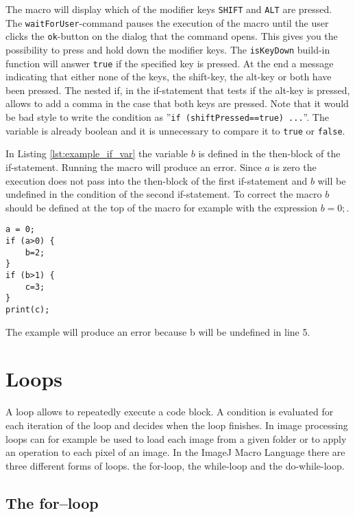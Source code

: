 The macro will display which of the modifier keys {\tt SHIFT} and {\tt ALT} are pressed. The {\tt waitForUser}-command pauses the execution of the macro until the user clicks the {\tt ok}-button on the dialog that the command opens. This gives you the possibility to press and hold down the modifier keys. The {\tt isKeyDown} build-in function will answer {\tt true} if the specified key is pressed. At the end a message indicating that either none of the keys, the shift-key, the alt-key or both have been pressed. The nested if, in the if-statement that tests if the alt-key is pressed, allows to add a comma in the case that both keys are pressed. Note that it would be bad style to write the condition as ''{\tt if (shiftPressed==true) ...}''. The variable is already boolean and it is unnecessary to compare it to {\tt true} or {\tt false}.

In Listing \ref{lst:example_if_var} the variable $b$ is defined in the then-block of the if-statement. Running the macro will produce an error. Since $a$ is zero the execution does not pass into the then-block of the first if-statement and $b$ will be undefined in the condition of the second if-statement. To correct the macro $b$ should be defined at the top of the macro for example with the expression $b = 0;$. 

\begin{listing}[H]
\begin{verbatim}
a = 0;
if (a>0) {
	b=2;
}
if (b>1) {
	c=3;
}
print(c);
\end{verbatim}
\caption{The example will produce an error because b will be undefined in line 5.}
\label{lst:example_if_var}
\end{listing}

\section{Loops}

A loop allows to repeatedly execute a code block. A condition is evaluated for each iteration of the loop and decides when the loop finishes. In image processing loops can for example be used to load each image from a given folder or to apply an operation to each pixel of an image. In the ImageJ Macro Language there are three different forms of loops. the for-loop, the while-loop and the do-while-loop.

\subsection{The for--loop}

